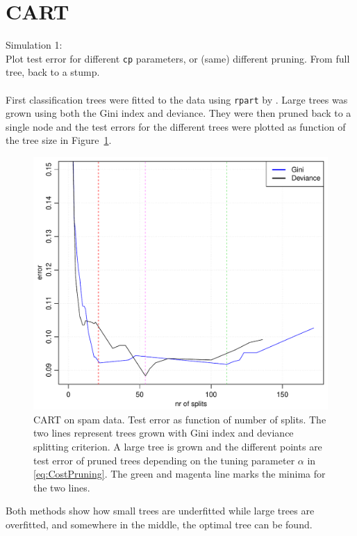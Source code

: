 \section{CART}
\label{sec:CARTsim}
Simulation 1: \\
Plot test error for different \verb+cp+ parameters, or (same) different pruning. From full tree, back to a stump.\\
\\
First classification trees were fitted to the data using \verb+rpart+ by \cite{rpart}. Large trees was grown using both the Gini index and deviance. They were then pruned back to a single node and the test errors for the different trees were plotted as function of the tree size in Figure~\ref{fig:cartCPSpam}. 
%
\begin{figure}[h!tp]
\begin{center}
    \includegraphics[scale=0.5]{./figures/cartCPSpam.pdf}
\end{center}
\caption{CART on spam data. Test error as function of number of splits. The two lines represent trees grown with Gini index and deviance splitting criterion. A large tree is grown and the different points are test error of pruned trees depending on the tuning parameter $\alpha$ in \eqref{eq:CostPruning}. The green and magenta line marks the minima for the two lines. }
\label{fig:cartCPSpam}
\end{figure}
%
Both methods show how small trees are underfitted while large trees are overfitted, and somewhere in the middle, the optimal tree can be found. 

